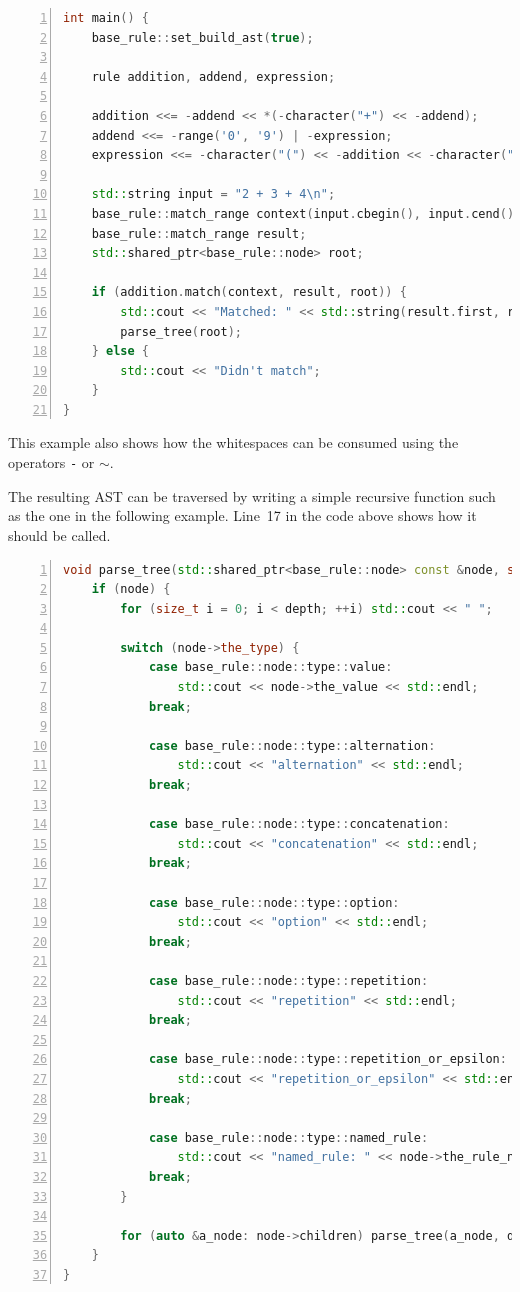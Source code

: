 \documentclass[12pt]{article}
\begin{document}
\begin{center}
	\begin{minipage}[h]{0.85\textwidth}
		\begin{lstlisting}[language=C++, breaklines=true, numbers=left]
int main() {
	base_rule::set_build_ast(true);

	rule addition, addend, expression;

	addition <<= -addend << *(-character("+") << -addend);
	addend <<= -range('0', '9') | -expression;
	expression <<= -character("(") << -addition << -character(")");

	std::string input = "2 + 3 + 4\n";
	base_rule::match_range context(input.cbegin(), input.cend());
	base_rule::match_range result;
	std::shared_ptr<base_rule::node> root;

	if (addition.match(context, result, root)) {
		std::cout << "Matched: " << std::string(result.first, result.second);
		parse_tree(root);
	} else {
		std::cout << "Didn't match";
	}
}
		\end{lstlisting}
	\end{minipage}
\end{center}

This example also shows how the whitespaces can be consumed using the operators \texttt{-} or \texttt{$\sim$}.

The resulting AST can be traversed by writing a simple recursive function such as the one in the following
example. Line~17 in the code above shows how it should be called.

\begin{center}
	\begin{minipage}[h]{0.95\textwidth}
		\begin{lstlisting}[language=C++, breaklines=true, numbers=left]
void parse_tree(std::shared_ptr<base_rule::node> const &node, size_t depth=0) {
	if (node) {
		for (size_t i = 0; i < depth; ++i) std::cout << " ";

		switch (node->the_type) {
			case base_rule::node::type::value:
				std::cout << node->the_value << std::endl;
			break;

			case base_rule::node::type::alternation:
				std::cout << "alternation" << std::endl;
			break;

			case base_rule::node::type::concatenation:
				std::cout << "concatenation" << std::endl;
			break;

			case base_rule::node::type::option:
				std::cout << "option" << std::endl;
			break;

			case base_rule::node::type::repetition:
				std::cout << "repetition" << std::endl;
			break;

			case base_rule::node::type::repetition_or_epsilon:
				std::cout << "repetition_or_epsilon" << std::endl;
			break;

			case base_rule::node::type::named_rule:
				std::cout << "named_rule: " << node->the_rule_name << std::endl;
			break;
		}

		for (auto &a_node: node->children) parse_tree(a_node, depth + 1);
	}
}
		\end{lstlisting}
	\end{minipage}
\end{center}
\end{document}
